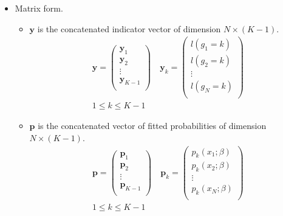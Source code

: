 \documentclass[12pt,notes,mathserif]{beamer}
\begin{document}
\begin{frame}[c]
	\frametitle{}
	\begin{itemize}
		\item  Matrix form.
		      \begin{itemize}
			      \item $\bm{y}$ is the concatenated indicator vector of dimension $N \times (K − 1)$.
			            \begin{gather*}
				            \bm{y}=
				            \begin{pmatrix}
					            \bm{y}_1     \\
					            \bm{y}_2     \\
					            \vdots       \\
					            \bm{y}_{K-1} \\
				            \end{pmatrix}\quad
				            \bm{y}_k=
				            \begin{pmatrix}
					            l(g_1=k) \\
					            l(g_2=k) \\
					            \vdots   \\
					            l(g_N=k) \\
				            \end{pmatrix}
				            \\
				            1\leqslant{}k\leqslant{}K-1
			            \end{gather*}
			      \item  $\bm{p}$ is the concatenated vector of fitted probabilities of dimension $N \times  (K − 1)$.
			            \begin{gather*}
				            \bm{p}=
				            \begin{pmatrix}
					            \bm{p}_1     \\
					            \bm{p}_2     \\
					            \vdots       \\
					            \bm{p}_{K-1} \\
				            \end{pmatrix}\quad
				            \bm{p}_k=
				            \begin{pmatrix}
					            p_k(x_1;\beta) \\
					            p_k(x_2;\beta) \\
					            \vdots         \\
					            p_k(x_N;\beta) \\
				            \end{pmatrix}\\
				            1\leqslant{}k\leqslant{}K-1
			            \end{gather*}
		      \end{itemize}
	\end{itemize}
\end{frame}
\end{document}
